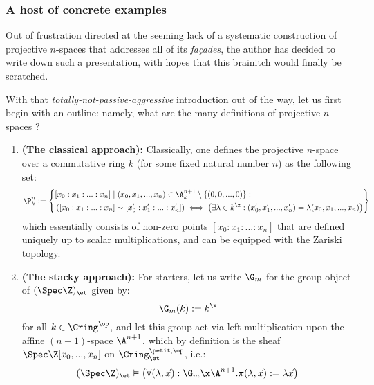 \subsubsection{A host of concrete examples}
    \begin{example} \label{example: projective_spaces} 
        Out of frustration directed at the seeming lack of a systematic construction of projective $n$-spaces that addresses all of its \textit{fa\c{c}ades}, the author has decided to write down such a presentation, with hopes that this brainitch would finally be scratched. 
        
        With that \textit{totally-not-passive-aggressive} introduction out of the way, let us first begin with an outline: namely, what are the many definitions of projective $n$-spaces ? 
            \begin{enumerate}
                \item \textbf{(The classical approach):} Classically, one defines the projective $n$-space over a commutative ring $k$ (for some fixed natural number $n$) as the following set:
                    $$
                        \P^n_k :=
                        \left\{\begin{aligned}
                            & [x_0 : x_1 : ... : x_n] \mid (x_0, x_1, ..., x_n) \in \A^{n+1}_k \setminus \{(0, 0, ..., 0)\}:
                            \\
                            & \left([x_0 : x_1 : ... : x_n] \sim [x'_0 : x'_1 : ... : x'_n]\right) \iff \left(\exists \lambda \in k^{\x}: (x'_0, x'_1, ..., x'_n) = \lambda (x_0, x_1, ..., x_n)\right)
                        \end{aligned}\right\}
                    $$
                which essentially consists of non-zero points $[x_0 : x_1 : ... : x_n]$ that are defined uniquely up to scalar multiplications, and can be equipped with the Zariski topology. 
                \item \textbf{(The stacky approach):} For starters, let us write $\G_m$ for the group object of $(\Spec \Z)_{\et}$ given by:
                    $$\G_m(k) := k^{\x}$$
                for all $k \in \Cring^{\op}$, and let this group act via left-multiplication upon the affine $(n+1)$-space $\A^{n+1}$, which by definition is the sheaf $\Spec \Z[x_0, ..., x_n]$ on $\Cring^{\petit, \op}_{\et}$, i.e.:
                    $$(\Spec \Z)_{\et} \vDash \left(\forall (\lambda, \vec{x}): \G_m \x \A^{n+1}. \pi(\lambda, \vec{x}) := \lambda \vec{x}\right)$$

\end{enumerate}
\end{example}
